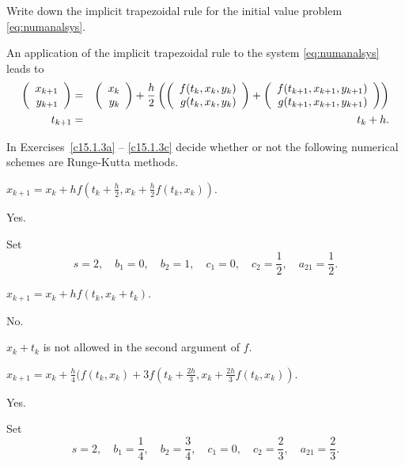 \documentclass{ximera}
\begin{document}
\begin{exercise} \label{c15.1.2}
Write down the implicit trapezoidal rule for the initial
value problem \eqref{eq:numanalsys}.

\begin{solution}
An application of the implicit trapezoidal rule to
the system \eqref{eq:numanalsys} leads to
\begin{eqnarray*}
\left(\begin{array}{r} x_{k+1} \\ y_{k+1}\end{array}\right) & = &  \left(\begin{array}{r} x_k \\ y_k\end{array}\right) +
\frac{h}{2} \left(\left(\begin{array}{r} f(t_k,x_k,y_k) \\ g(t_k,x_k,y_k)\end{array}\right)
+\left(\begin{array}{r} f(t_{k+1},x_{k+1},y_{k+1}) \\ g(t_{k+1},x_{k+1},y_{k+1})\end{array}\right)\right)\\
t_{k+1} &=& t_k + h.
\end{eqnarray*}



\end{solution}
\end{exercise}

\noindent In Exercises~\ref{c15.1.3a} -- \ref{c15.1.3c}
decide whether or not the following numerical schemes are Runge-Kutta methods.
\begin{exercise} \label{c15.1.3a}
$x_{k+1} = x_k + hf(t_k+\frac{h}{2},x_k+\frac{h}{2}f(t_k,x_k))$.

\begin{solution}
\ans Yes.

\soln Set
\[
s=2,\quad b_1=0,\quad b_2=1,\quad c_1=0,\quad c_2=\frac{1}{2},\quad
a_{21}=\frac{1}{2}.
\]


\end{solution}
\end{exercise}
\begin{exercise} \label{c15.1.3b}
$x_{k+1} = x_k + hf(t_k,x_k+t_k)$.

\begin{solution}
\ans No.

\soln $x_k+t_k$ is not allowed in the second argument of $f$.

\end{solution}
\end{exercise}
\begin{exercise} \label{c15.1.3c}
$x_{k+1} = x_k + 
\frac{h}{4}(f(t_k,x_k)+3f(t_k+\frac{2h}{3},x_k+\frac{2h}{3}f(t_k,x_k))$.

\begin{solution}
\ans Yes.

\soln Set
\[
s=2,\quad b_1=\frac{1}{4},\quad b_2=\frac{3}{4},\quad
c_1=0,\quad c_2=\frac{2}{3},\quad a_{21}=\frac{2}{3}.
\]

\end{solution}
\end{exercise}
\end{document}
